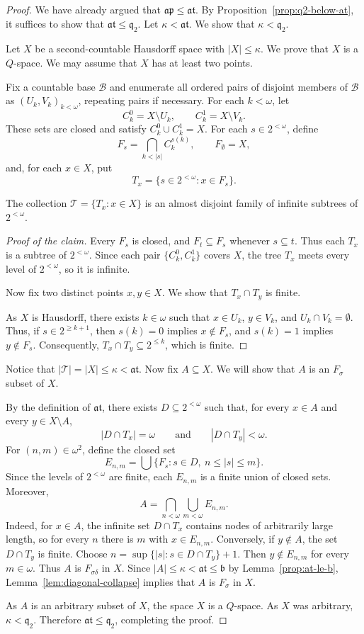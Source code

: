 \begin{proof}
We have already argued that $\mathfrak{ap}\leq \mathfrak{at}$.
By Proposition~\ref{prop:q2-below-at}, it suffices to show that $\mathfrak{at}\leq \mathfrak q_{2}$.
Let $\kappa<\mathfrak{at}$.
We show that $\kappa<\mathfrak q_{2}$.

Let $X$ be a second-countable Hausdorff space with $|X|\leq\kappa$.
We prove that $X$ is a $Q$-space.
We may assume that $X$ has at least two points.

Fix a countable base $\mathcal B$ and enumerate all ordered
pairs of disjoint members of $\mathcal B$ as $(U_k,V_k)_{k<\omega}$,
repeating pairs if necessary.
For each $k<\omega$, let
\[
  C_k^0=X\setminus U_k,\qquad C_k^1=X\setminus V_k.
\]
These sets are closed and satisfy $C_k^0\cup C_k^1=X$.
For each $s\in 2^{<\omega}$, define
\[
  F_s=\bigcap_{k<|s|}C_k^{s(k)},\qquad F_\emptyset=X,
\]
and, for each $x\in X$, put
\[
  T_x=\{s\in 2^{<\omega}:x\in F_s\}.
\]
\begin{claim}
  The collection $\mathcal T=\{T_x:x\in X\}$ is an almost disjoint family of infinite subtrees of $2^{<\omega}$.
\end{claim}
\begin{proof}[Proof of the claim]
  Every $F_s$ is closed, and $F_t\subseteq F_s$ whenever $s\subseteq t$.
  Thus each $T_x$ is a subtree of $2^{<\omega}$.
  Since each pair $\{C_k^0,C_k^1\}$ covers $X$, the tree $T_x$ meets
  every level of $2^{<\omega}$, so it is infinite.

  Now fix two distinct points $x,y\in X$.
  We show that $T_x\cap T_y$ is finite.

  As $X$ is Hausdorff, there exists $k\in \omega$ such that $x\in U_k$, $y\in V_k$, and $U_k\cap V_k=\emptyset$.
  Thus, if $s\in 2^{\geq k+1}$, then $s(k)=0$ implies $x\notin F_s$, and $s(k)=1$ implies $y\notin F_s$.
  Consequently, $T_x\cap T_y\subseteq2^{\leq k}$, which is finite.
\end{proof}

Notice that $|\mathcal T|=|X|\leq\kappa<\mathfrak{at}$.
Now fix $A\subseteq X$.
We will show that $A$ is an $F_\sigma$ subset of $X$.

By the definition of $\mathfrak{at}$, there exists
$D\subseteq 2^{<\omega}$ such that, for every $x\in A$ and every $y\in X\setminus A$,
\[
  |D\cap T_x|=\omega \qquad \text{and} \qquad
  |D\cap T_y|<\omega.
\]
For $(n,m)\in\omega^2$, define the closed set
\[
  E_{n,m}=\bigcup\{F_s:s\in D,\ n\leq |s|\leq m\}.
\]
Since the levels of $2^{<\omega}$ are finite, each $E_{n,m}$ is a finite
union of closed sets. Moreover,
\[
  A=\bigcap_{n<\omega}\bigcup_{m<\omega}E_{n,m}.
\]
Indeed, for $x\in A$, the infinite set $D\cap T_x$ contains nodes of
arbitrarily large length, so for every $n$ there is $m$ with
$x\in E_{n,m}$. Conversely, if $y\notin A$, the set $D\cap T_y$ is
finite. Choose $n=\sup\{|s|:s\in D\cap T_y\}+1$.
Then
$y\notin E_{n,m}$ for every $m\in \omega$.
Thus $A$ is $F_{\sigma\delta}$ in $X$.
Since $|A|\leq\kappa<\mathfrak{at}\leq\mathfrak b$ by
Lemma~\ref{prop:at-le-b}, Lemma~\ref{lem:diagonal-collapse} implies
that $A$ is $F_\sigma$ in $X$.

As $A$ is an arbitrary subset of $X$, the space $X$ is a $Q$-space.
As $X$ was arbitrary, $\kappa<\mathfrak q_2$.
Therefore $\mathfrak{at}\leq\mathfrak q_2$, completing the proof.
\end{proof}
